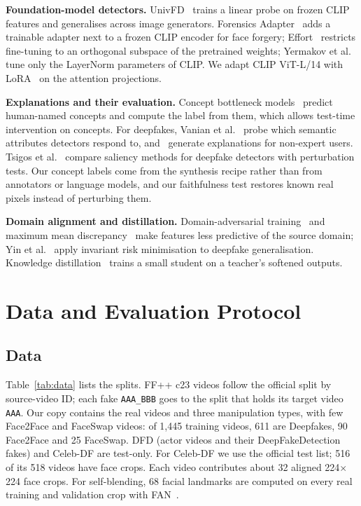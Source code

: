 \documentclass[conference]{IEEEtran}
\begin{document}
\textbf{Foundation-model detectors.} UnivFD~\cite{univfd} trains a linear probe on frozen CLIP~\cite{clip} features
and generalises across image generators. Forensics Adapter~\cite{fa} adds a trainable adapter next to a frozen CLIP
encoder for face forgery; Effort~\cite{effort} restricts fine-tuning to an orthogonal subspace of the pretrained
weights; Yermakov et al.~\cite{lnclip} tune only the LayerNorm parameters of CLIP. We adapt CLIP ViT-L/14 with
LoRA~\cite{lora} on the attention projections.

\textbf{Explanations and their evaluation.} Concept bottleneck models~\cite{cbm} predict human-named concepts and
compute the label from them, which allows test-time intervention on concepts. For deepfakes, Vanian et
al.~\cite{whyfake} probe which semantic attributes detectors respond to, and~\cite{mansoor,dfp2e,laylens} generate
explanations for non-expert users. Tsigos et al.~\cite{tsigos} compare saliency methods for deepfake detectors with
perturbation tests. Our concept labels come from the synthesis recipe rather than from annotators or language
models, and our faithfulness test restores known real pixels instead of perturbing them.

\textbf{Domain alignment and distillation.} Domain-adversarial training~\cite{ganin} and maximum mean
discrepancy~\cite{mmd} make features less predictive of the source domain; Yin et al.~\cite{irm} apply invariant
risk minimisation to deepfake generalisation. Knowledge distillation~\cite{hinton} trains a small student on a
teacher's softened outputs.

\section{Data and Evaluation Protocol}\label{sec:protocol}

\subsection{Data}\label{sec:data}
Table~\ref{tab:data} lists the splits. FF++ c23 videos follow the official split by source-video ID; each fake
\texttt{AAA\_BBB} goes to the split that holds its target video \texttt{AAA}. Our copy contains the real videos and
three manipulation types, with few Face2Face and FaceSwap videos: of 1,445 training videos, 611 are Deepfakes, 90
Face2Face and 25 FaceSwap. DFD (actor videos and their DeepFakeDetection fakes) and Celeb-DF are test-only. For
Celeb-DF we use the official test list; 516 of its 518 videos have face crops. Each video contributes about 32
aligned 224$\times$224 face crops. For self-blending, 68 facial landmarks are computed on every real training and
validation crop with FAN~\cite{fan}.
\end{document}
